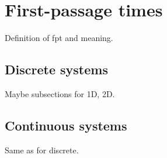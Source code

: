 \chapter{First-passage times}\label{ch:fpt}
Definition of fpt and meaning.\newline
\lipsum[1-5]


\clearpage
\section{Discrete systems}\label{sec:discreteFPT}
Maybe subsections for 1D, 2D.\newline
\lipsum[1-3]


\section{Continuous systems}\label{sec:continuousFPT}
Same as for discrete.\newline
\lipsum[1-3]

